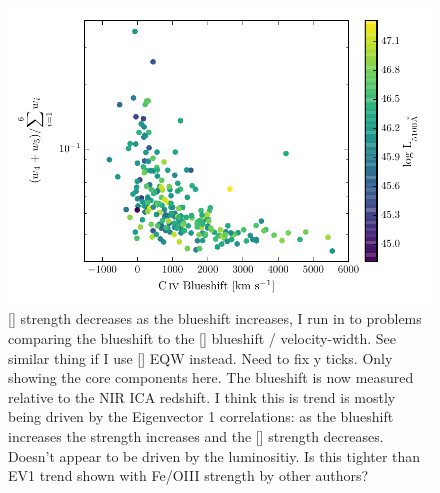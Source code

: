 \begin{figure}
    \centering
    \includegraphics[width=\columnwidth]{figures/chapter04/civ_blueshift_oiii_strength.pdf} 
    \caption{[] strength decreases as the  blueshift increases, I run in to problems comparing the  blueshift to the [] blueshift / velocity-width. See similar thing if I use [] EQW instead. Need to fix y ticks. Only showing the core components here. The  blueshift is now measured relative to the NIR ICA redshift. I think this is trend is mostly being driven by the Eigenvector 1 correlations: as the blueshift increases the  strength increases and the [] strength decreases. Doesn't appear to be driven by the luminositiy. Is this tighter than EV1 trend shown with Fe/OIII strength by other authors? }     
    \label{fig:civ_blueshift_oiii_strength}
\end{figure}


